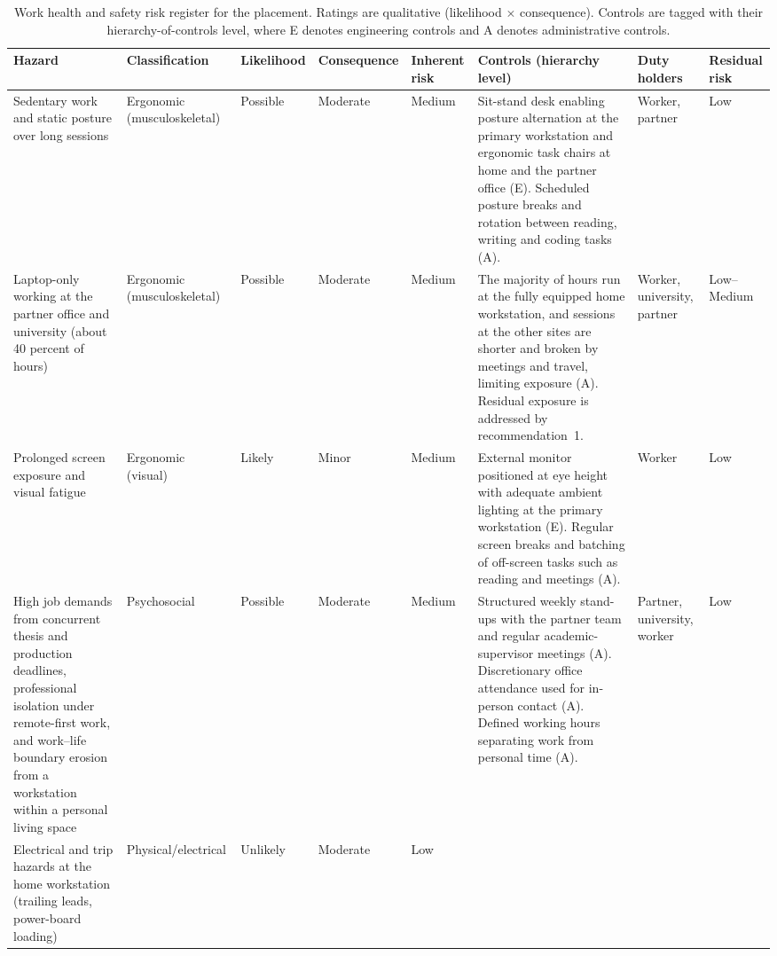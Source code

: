 \begin{table}[t]
\centering
\footnotesize
\setlength{\tabcolsep}{3pt}
\caption{Work health and safety risk register for the placement. Ratings
are qualitative (likelihood $\times$ consequence). Controls are tagged with
their hierarchy-of-controls level, where E denotes engineering controls and
A denotes administrative controls.}
\label{tab:whs-register}
\begin{tabular}{p{22mm} p{18mm} p{12mm} p{14mm} p{13mm} p{50mm} p{19mm} p{13mm}}
\toprule
Hazard & Classification & Likelihood & Consequence & Inherent risk &
Controls (hierarchy level) & Duty holders & Residual risk \\
\midrule
Sedentary work and static posture over long sessions & Ergonomic
(musculoskeletal) & Possible & Moderate & Medium & Sit-stand desk enabling
posture alternation at the primary workstation and ergonomic task chairs at
home and the partner office (E). Scheduled posture breaks and rotation
between reading, writing and coding tasks (A). & Worker, partner & Low \\
\addlinespace
Laptop-only working at the partner office and university (about 40 percent
of hours) & Ergonomic (musculoskeletal) & Possible & Moderate & Medium &
The majority of hours run at the fully equipped home workstation, and
sessions at the other sites are shorter and broken by meetings and travel,
limiting exposure (A). Residual exposure is addressed by
recommendation~1. & Worker, university, partner & Low--Medium \\
\addlinespace
Prolonged screen exposure and visual fatigue & Ergonomic (visual) & Likely
& Minor & Medium & External monitor positioned at eye height with adequate
ambient lighting at the primary workstation (E). Regular screen breaks and
batching of off-screen tasks such as reading and meetings (A). & Worker &
Low \\
\addlinespace
High job demands from concurrent thesis and production deadlines,
professional isolation under remote-first work, and work--life boundary
erosion from a workstation within a personal living space & Psychosocial &
Possible & Moderate & Medium & Structured weekly stand-ups with the
partner team and regular academic-supervisor meetings (A). Discretionary
office attendance used for in-person contact (A). Defined working hours
separating work from personal time (A). & Partner, university, worker &
Low \\
\addlinespace
Electrical and trip hazards at the home workstation (trailing leads,
power-board loading) & Physical/electrical & Unlikely & Moderate & Low &

\end{tabular}
\end{table}
